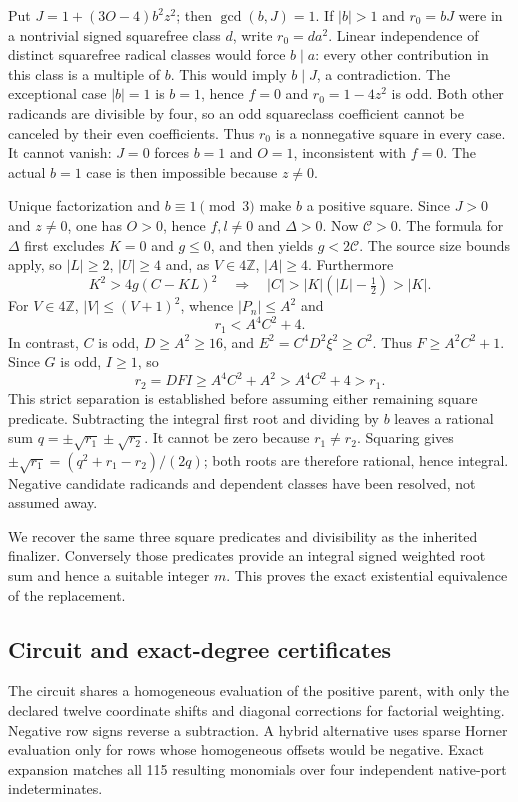 Put $J=1+(3O-4)b^2z^2$; then $\gcd(b,J)=1$. If $|b|>1$ and
$r_0=bJ$ were in a nontrivial signed squarefree class $d$, write
$r_0=da^2$. Linear independence of distinct squarefree radical classes
would force $b\mid a$: every other contribution in this class is a
multiple of $b$. This would imply $b\mid J$, a contradiction.
The exceptional case $|b|=1$ is $b=1$, hence $f=0$ and
$r_0=1-4z^2$ is odd. Both other radicands are divisible by four, so
an odd squareclass coefficient cannot be canceled by their even
coefficients. Thus $r_0$ is a nonnegative square in every case.
It cannot vanish: $J=0$ forces $b=1$ and $O=1$, inconsistent with $f=0$.
The actual $b=1$ case is then impossible because $z\ne0$.

Unique factorization and $b\equiv1\pmod3$ make $b$ a positive square.
Since $J>0$ and $z\ne0$, one has $O>0$, hence $f,l\ne0$ and $\Delta>0$.
Now $\mathcal C>0$. The formula for $\Delta$ first excludes $K=0$ and
$g\le0$, and then yields $g<2\mathcal C$. The source size bounds apply,
so $|L|\ge2$, $|U|\ge4$ and, as $V\in4\mathbb Z$, $|A|\ge4$.
Furthermore
\[
 K^2>4g(C-KL)^2\quad\Longrightarrow\quad
 |C|>|K|(|L|-\tfrac12)>|K|.
\]
For $V\in4\mathbb Z$, $|V|\le(V+1)^2$, whence $|P_n|\le A^2$ and
\[
 r_1<A^4C^2+4.
\]
In contrast, $C$ is odd, $D\ge A^2\ge16$, and
$E^2=C^4D^2\xi^2\ge C^2$. Thus $F\ge A^2C^2+1$.
Since $G$ is odd, $I\ge1$, so
\[
 r_2=DFI\ge A^4C^2+A^2>A^4C^2+4>r_1.
\]
This strict separation is established before assuming either remaining
square predicate. Subtracting the integral first root and dividing by $b$
leaves a rational sum $q=\pm\sqrt{r_1}\pm\sqrt{r_2}$. It cannot be zero
because $r_1\ne r_2$. Squaring gives
$\pm\sqrt{r_1}=(q^2+r_1-r_2)/(2q)$; both roots are therefore rational,
hence integral. Negative candidate radicands and dependent classes have
been resolved, not assumed away.

We recover the same three square predicates and divisibility as the
inherited finalizer. Conversely those predicates provide an integral signed
weighted root sum and hence a suitable integer $m$. This proves the exact
existential equivalence of the replacement.

\subsection{Circuit and exact-degree certificates}

The circuit shares a homogeneous evaluation of the positive parent,
with only the declared twelve coordinate shifts and diagonal corrections
for factorial weighting. Negative row signs reverse a subtraction.
A hybrid alternative uses sparse Horner evaluation only for rows whose
homogeneous offsets would be negative. Exact expansion matches all
115 resulting monomials over four independent native-port indeterminates.

